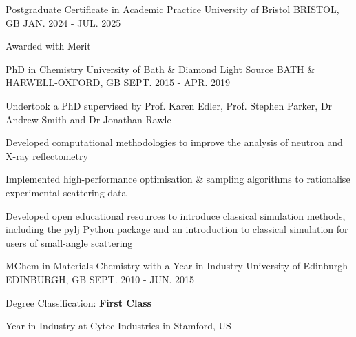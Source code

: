 \begin{cventries}
  \cventry
    {Postgraduate Certificate in Academic Practice}
    {University of Bristol}
    {BRISTOL, GB}
    {JAN. 2024 - JUL. 2025}
    {
      \begin{cvitems}
        \item {Awarded with Merit}
      \end{cvitems}
    }
  \cventry
    {PhD in Chemistry}
    {University of Bath \& Diamond Light Source}
    {BATH \& HARWELL-OXFORD, GB}
    {SEPT. 2015 - APR. 2019}
    {
      \begin{cvitems}
        \item {Undertook a PhD supervised by Prof. Karen Edler, Prof. Stephen Parker, Dr Andrew Smith and Dr Jonathan Rawle}
        \item {Developed computational methodologies to improve the analysis of neutron and X-ray reflectometry}
        \item {Implemented high-performance optimisation \& sampling algorithms to rationalise experimental scattering data}
        \item {Developed open educational resources to introduce classical simulation methods, including the pylj Python package and an introduction to classical simulation for users of small-angle scattering}
      \end{cvitems}
    }
  \cventry
    {MChem in Materials Chemistry with a Year in Industry}
    {University of Edinburgh}
    {EDINBURGH, GB}
    {SEPT. 2010 - JUN. 2015}
    {
      \begin{cvitems}
        \item {Degree Classification: \textbf{First Class}}
        \item {Year in Industry at Cytec Industries in Stamford, US}
      \end{cvitems}
    }
\end{cventries}
